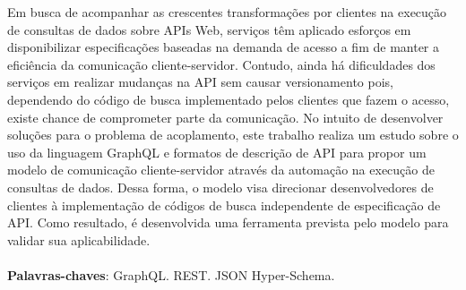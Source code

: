 \begin{resumo}
  Em busca de acompanhar as crescentes transformações por clientes na execução de consultas de dados sobre APIs Web, serviços têm aplicado esforços em disponibilizar especificações baseadas na demanda de acesso a fim de manter a eficiência da comunicação cliente-servidor. Contudo, ainda há dificuldades dos serviços em realizar mudanças na API sem causar versionamento pois, dependendo do código de busca implementado pelos clientes que fazem o acesso, existe chance de comprometer parte da comunicação. No intuito de desenvolver soluções para o problema de acoplamento, este trabalho realiza um estudo sobre o uso da linguagem GraphQL e formatos de descrição de API para propor um modelo de comunicação cliente-servidor através da automação na execução de consultas de dados. Dessa forma, o modelo visa direcionar desenvolvedores de clientes à implementação de códigos de busca independente de especificação de API. Como resultado, é desenvolvida uma ferramenta prevista pelo modelo para validar sua aplicabilidade. \\ \\
  \textbf{Palavras-chaves}: GraphQL. REST. JSON Hyper-Schema.
\end{resumo}
